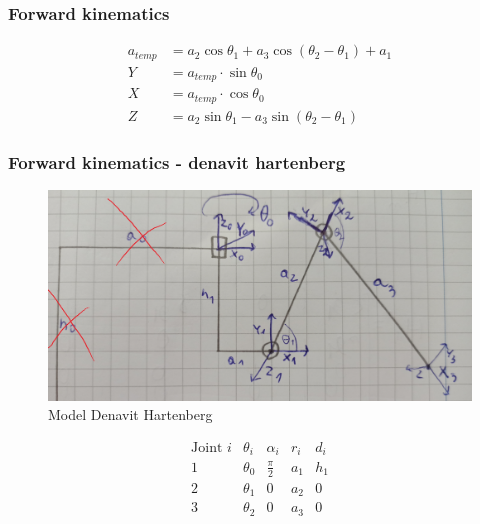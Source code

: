 \documentclass[a4paper,13pt]{article}
\begin{document}
\subsubsection{Forward kinematics}

\begin{equation} \label{FK_ver_1}
\begin{split}
a_{temp} &= a_2 \cos{\theta_1} + a_3 \cos{\left(\theta_2 - \theta_1\right)} + a_1\\
Y &= a_{temp} \cdot \sin{\theta_0}\\
X &= a_{temp} \cdot \cos{\theta_0}\\
Z &= a_2 \sin{\theta_1} - a_3 \sin{\left(\theta_2 - \theta_1\right)}
\end{split}
\end{equation}

\subsubsection{Forward kinematics - denavit hartenberg \cite{DH_AA_article}}

\begin{figure}[H]
\includegraphics[width=\textwidth]{img/DH_model.jpg}
\caption{Model Denavit Hartenberg}
\label{math_model}
\end{figure}

\begin{equation}
\begin{array}{c|cccc}
\textrm{Joint } i & \theta_i & \alpha_i & r_i & d_i \\
\hline
1  & \theta_0 & \frac{\pi}{2} & a_1 & h_1 \\
2  & \theta_1 & 0 & a_2 & 0 \\
3  & \theta_2 & 0 & a_3 & 0 \\
\end{array}
\end{equation}
\end{document}
